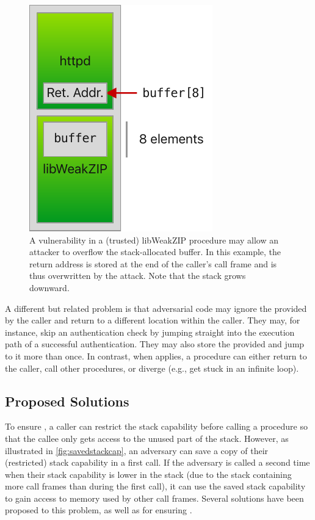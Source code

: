 \documentclass[main.tex]{subfiles}
\begin{document}
\begin{figure}
	\begin{center}
		\includegraphics{Images/Buffer Overflow.pdf}
	\end{center}
	\caption{A vulnerability in a (trusted) libWeakZIP procedure may allow an attacker to overflow the stack-allocated buffer. In this example, the return address is stored at the end of the caller's call frame and is thus overwritten by the attack. Note that the stack grows downward.}
	\label{fig:buffoverflow}
\end{figure}

A different but related problem is that adversarial code may ignore the  provided by the caller and return to a different location within the caller. They may, for instance, skip an authentication check by jumping straight into the execution path of a successful authentication. They may also store the provided  and jump to it more than once. In contrast, when \textbf{} applies, a procedure can either return to the caller, call other procedures, or diverge (e.g., get stuck in an infinite loop).

\subsection*{Proposed Solutions}
To ensure , a caller can restrict the stack capability before calling a procedure so that the callee only gets access to the unused part of the stack. However, as illustrated in \cref{fig:savedstackcap}, an adversary can save a copy of their (restricted) stack capability in a first call. If the adversary is called a second time when their stack capability is lower in the stack (due to the stack containing more call frames than during the first call), it can use the saved stack capability to gain access to memory used by other call frames. Several solutions have been proposed to this problem, as well as for ensuring .
\end{document}

